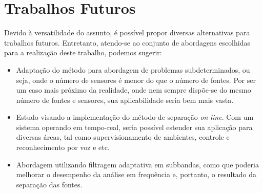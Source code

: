 \section{Trabalhos Futuros}

Devido à versatilidade do assunto, é possível propor diversas alternativas para trabalhos futuros. Entretanto, atendo-se ao conjunto de abordagens escolhidas para a realização deste trabalho, podemos sugerir:
\begin{itemize}
    \item Adaptação do método para abordagem de problemas subdeterminados, ou seja, onde o número de sensores é menor do que o número de fontes. Por ser um caso mais próximo da realidade, onde nem sempre dispõe-se do mesmo número de fontes e sensores, sua aplicabilidade seria bem mais vasta. 
    
    \item Estudo visando a implementação do método de separação \textit{on-line}. Com um sistema operando em tempo-real, seria possível estender sua aplicação para diversas áreas, tal como supervisionamento de ambientes, controle e reconhecimento por voz e etc.
    
    \item Abordagem utilizando filtragem adaptativa em subbandas, como que poderia melhorar o desempenho da análise em frequência e, portanto, o resultado da separação das fontes.
\end{itemize}